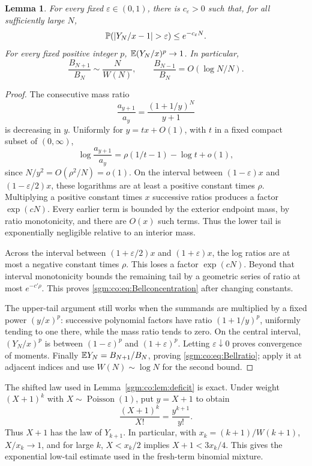 \documentclass[11pt,letterpaper]{article}
\newtheorem{lemma}[theorem]{Lemma}\newtheorem{proposition}[theorem]{Proposition}\newtheorem{corollary}[theorem]{Corollary}
\theoremstyle{remark}\newtheorem{remark}[theorem]{Remark}
\newcommand{\Poi}{\operatorname{Poisson}}\newcommand{\Bin}{\operatorname{Bin}}
\theoremstyle{definition}\newtheorem{definition}[theorem]{Definition}
\begin{document}
\begin{lemma}\label{sgm:co:lem:Bell}
For every fixed $\varepsilon\in(0,1)$, there is $c_\varepsilon>0$ such that, for all sufficiently large $N$,
\begin{equation}\label{sgm:co:eq:Bellconcentration}
 \Prob(|Y_N/x-1|>\varepsilon)\le e^{-c_\varepsilon N}.
\end{equation}
For every fixed positive integer $p$, $\mathbb E(Y_N/x)^p\to1$. In particular,
\begin{equation}\label{sgm:co:eq:Bellratio}
 \frac{B_{N+1}}{B_N}\sim\frac{N}{W(N)},\qquad
 \frac{B_{N-1}}{B_N}=O(\log N/N).
\end{equation}
\end{lemma}
\begin{proof}
The consecutive mass ratio
\[
 \frac{a_{y+1}}{a_y}=\frac{(1+1/y)^N}{y+1}
\]
is decreasing in $y$. Uniformly for $y=tx+O(1)$, with $t$ in a fixed compact subset of $(0,\infty)$,
\begin{equation}\label{sgm:co:eq:ratiolog}
 \log\frac{a_{y+1}}{a_y}=\rho(1/t-1)-\log t+o(1),
\end{equation}
since $N/y^2=O(\rho^2/N)=o(1)$.
On the interval between $(1-\varepsilon)x$ and $(1-\varepsilon/2)x$, these logarithms are at least a positive constant times $\rho$. Multiplying a positive constant times $x$ successive ratios produces a factor $\exp(cN)$. Every earlier term is bounded by the exterior endpoint mass, by ratio monotonicity, and there are $O(x)$ such terms. Thus the lower tail is exponentially negligible relative to an interior mass.

Across the interval between $(1+\varepsilon/2)x$ and $(1+\varepsilon)x$, the log ratios are at most a negative constant times $\rho$. This loses a factor $\exp(cN)$. Beyond that interval monotonicity bounds the remaining tail by a geometric series of ratio at most $e^{-c'\rho}$. This proves \eqref{sgm:co:eq:Bellconcentration} after changing constants.

The upper-tail argument still works when the summands are multiplied by a fixed power $(y/x)^p$: successive polynomial factors have ratio $(1+1/y)^p$, uniformly tending to one there, while the mass ratio tends to zero. On the central interval, $(Y_N/x)^p$ is between $(1-\varepsilon)^p$ and $(1+\varepsilon)^p$. Letting $\varepsilon\downarrow0$ proves convergence of moments. Finally $\mathbb E Y_N=B_{N+1}/B_N$, proving \eqref{sgm:co:eq:Bellratio}; apply it at adjacent indices and use $W(N)\sim\log N$ for the second bound.
\end{proof}
The shifted law used in Lemma~\ref{sgm:co:lem:deficit} is exact. Under weight $(X+1)^k$ with $X\sim\Poi(1)$, put $y=X+1$ to obtain
\[
 \frac{(X+1)^k}{X!}=\frac{y^{k+1}}{y!}.
\]
Thus $X+1$ has the law of $Y_{k+1}$. In particular, with $x_k=(k+1)/W(k+1)$, $X/x_k\to1$, and for large $k$, $X<x_k/2$ implies $X+1<3x_k/4$. This gives the exponential low-tail estimate used in the fresh-term binomial mixture.
\end{document}

